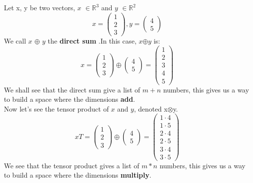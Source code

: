 \documentclass[12pt,a4paper]{article}
\begin{document}
Let x, y be two vectors, $x$ $\in\mathbb{R}^3$ and $y$ $\in\mathbb{R}^2$
\[x = 
\begin{pmatrix}
1\\2\\3
\end{pmatrix}
,y = 
\begin{pmatrix}
4\\5
\end{pmatrix}
\]
We call $x$ $\oplus$ $y$ the \textbf{direct sum} .In this case, $x$$\oplus$$y$ is:
\[x = 
\begin{pmatrix}
1\\2\\3
\end{pmatrix}
\oplus
\begin{pmatrix}
4\\5
\end{pmatrix}
=\begin{pmatrix}
1\\2\\3\\4\\5
\end{pmatrix}
\]
We shall see that the direct sum give a list of $m + n$ numbers, this gives us a way to build a space where the dimensions \textbf{add}.\\
Now let's see the tensor product of $x$ and $y$, denoted x$\otimes$y.
\[xT = 
\begin{pmatrix}
1\\2\\3
\end{pmatrix}
\oplus
\begin{pmatrix}
4\\5
\end{pmatrix}
=\begin{pmatrix}
1 \cdot 4 \\ 1 \cdot 5\\2 \cdot 4\\2 \cdot 5\\3 \cdot 4\\3 \cdot 5
\end{pmatrix}
\]
We see that the tensor product gives a list of $m * n$ numbers, this gives us a way to build a space where the dimensions \textbf{multiply}.
\end{document}

